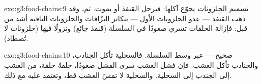 \begin{solution}{exo:g3:food-chains:9}
تسميم الحلزونات يجوّع آكلها: فيرحل القنفذ أو يموت. ثم، وقد ذهب
القنفذ --- عدو الحلزونات الأول --- تتكاثر البزّاقات والحلزونات
الباقية أشد من قبل: فإزالة الحلقات تسري صعودًا في السلسلة (قنفذ
جائع) ونزولًا فيها (حلزونات لا تُصطاد).
\end{solution}

\begin{solution}{exo:g3:food-chains:10}
صحيح --- عبر وسط السلسلة. فالسحلية تأكل الجنادب، والجنادب تأكل
العشب: فإن فشل العشب سرى الفشل صعودًا، حلقةً حلقة، من العشب إلى
الجندب إلى السحلية. والسحلية لا تمسّ العشب قط، وتعتمد عليه مع
ذلك.
\end{solution}
